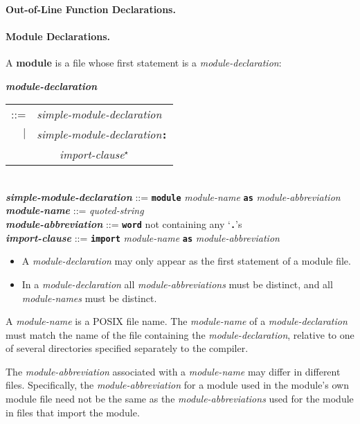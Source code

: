 \documentclass[12pt]{article}
\newcommand{\subsubsubsection}[1]{\paragraph[#1]{#1.}}
\newcommand{\TT}[1]{{\tt \bfseries #1}}
\newcommand{\STAR}{{\Large $^\star$}}
\newcommand{\key}[1]{{\rm \bfseries #1}}
\newcommand{\ttkey}[1]{{\tt \bfseries #1}}
\newcommand{\emkey}[1]{{\em \bfseries #1}}
\newenvironment{indpar}[1][0.3in]%
	{\begin{list}{}%
		     {\setlength{\itemsep}{0in}%
		      \setlength{\topsep}{0in}%
		      \setlength{\parsep}{1ex}%
		      \setlength{\labelwidth}{#1}%
		      \setlength{\leftmargin}{#1}%
		      \addtolength{\leftmargin}{\labelsep}}%
	 \item}%
	{\end{list}}
\begin{document}
\subsubsubsection{Out-of-Line Function Declarations}
\label{OUT-OF-LINE-FUNCTION-DECLARATIONS}

\subsubsubsection{Module Declarations}
\label{MODULE-DECLARATIONS}

A \key{module} is a file whose first statement is a {\em module-declaration}:

\begin{indpar}
\emkey{module-declaration}\label{MODULE-DECLARATION}
    \begin{tabular}[t]{rl}
    ::= & {\em simple-module-declaration} \\
    $|$ & {\em simple-module-declaration}\TT{:} \\
	& \TT{~~~~}{\em import-clause}\STAR{} \\
    \end{tabular} \\
\emkey{simple-module-declaration} ::= \TT{module} {\em module-name}
        \TT{as} {\em module-abbreviation} \\
\emkey{module-name}\label{MODULE-NAME} ::= {\em quoted-string} \\
\emkey{module-abbreviation}\label{MODULE-ABBREVIATION}
	::= \TT{word} not containing any `\TT{.}'s \\
\emkey{import-clause}\label{IMPORT-CLAUSE}
    ::= \ttkey{import} {\em module-name} \TT{as} {\em module-abbreviation} \\

\begin{itemize}

\item
A {\em module-declaration} may only appear as the first statement
of a module file.

\item
In a {\em module-declaration} all {\em module-abbreviations} must be
distinct, and all {\em module-names} must be distinct.
\end{itemize}
\end{indpar}

A {\em module-name} is a POSIX file name.
The {\em module-name} of a {\em module-declaration} must match the
name of the file containing the
{\em module-declaration}, relative to one of several directories
specified separately to the compiler.

The {\em module-abbreviation} associated with a {\em module-name}
may differ in different files.  Specifically, the {\em module-abbreviation}
for a module used in the module's own module file need not be the same
as the {\em module-abbreviations} used for the module in files
that import the module.
\end{document}
